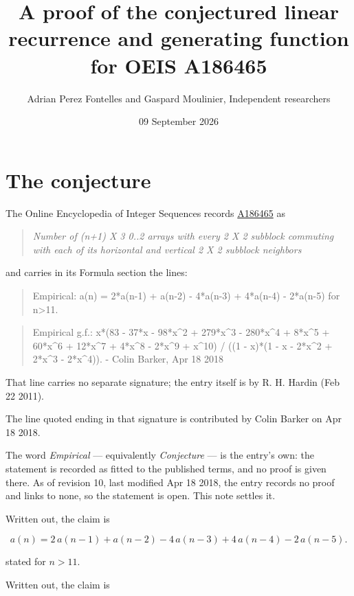 \documentclass[11pt]{article}
\title{A proof of the conjectured linear recurrence and generating function for OEIS A186465}
\author{Adrian Perez Fontelles and Gaspard Moulinier, Independent researchers}
\date{09 September 2026}
\theoremstyle{definition}
\begin{document}
\maketitle
\section{The conjecture}

The Online Encyclopedia of Integer Sequences records \href{https://oeis.org/A186465}{A186465} as

\begin{quote}\itshape Number of (n+1) X 3 0..2 arrays with every 2 X 2 subblock commuting with each of its horizontal and vertical 2 X 2 subblock neighbors\end{quote}

and carries in its Formula section the lines:

\begin{quote}\ttfamily Empirical: a(n) = 2*a(n-1) + a(n-2) - 4*a(n-3) + 4*a(n-4) - 2*a(n-5) for n>11.\end{quote}

\begin{quote}\ttfamily Empirical g.f.: x*(83 - 37*x - 98*x\textasciicircum{}2 + 279*x\textasciicircum{}3 - 280*x\textasciicircum{}4 + 8*x\textasciicircum{}5 + 60*x\textasciicircum{}6 + 12*x\textasciicircum{}7 + 4*x\textasciicircum{}8 - 2*x\textasciicircum{}9 + x\textasciicircum{}10) / ((1 - x)*(1 - x - 2*x\textasciicircum{}2 + 2*x\textasciicircum{}3 - 2*x\textasciicircum{}4)). - Colin Barker, Apr 18 2018\end{quote}

That line carries no separate signature; the entry itself is by R. H. Hardin (Feb 22 2011).

The line quoted ending in that signature is contributed by Colin Barker on Apr 18 2018.

The word {\itshape Empirical} --- equivalently {\itshape Conjecture} --- is the entry's own: the statement is recorded as fitted to the published terms, and no proof is given there. As of revision 10, last modified Apr 18 2018, the entry records no proof and links to none, so the statement is open. This note settles it.

Written out, the claim is

\[a(n) = 2\,a(n-1) + a(n-2) - 4\,a(n-3) + 4\,a(n-4) - 2\,a(n-5).\]

stated for $n > 11$.

Written out, the claim is
\end{document}
